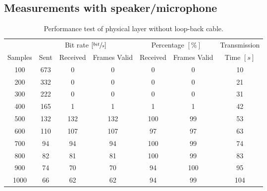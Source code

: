 	\subsection{Measurements with speaker/microphone}
	\begin{table}[!h]
		\begin{center}
			\begin{tabular}{c|c c c|c c|c}
			& \multicolumn{3}{|c|}{Bit rate $[\sfrac{bit}{s}]$} & \multicolumn{2}{c|}{Percentage $[\%]$} & Transmission \\
			Samples & Sent & Received & Frames Valid & Received & Frames Valid & Time $[s]$\\
			\hline
			100 & 673 & 0 & 0 & 0 & 0 & 10 \\
			200 & 332 & 0 & 0 & 0 & 0 & 21 \\
			300 & 222 & 0 & 0 & 0 & 0 & 31 \\
			400 & 165 & 1 & 1 & 1 & 1 & 42 \\
			500 & 132 & 132 & 132 & 100 & 99 & 53 \\
			600 & 110 & 107 & 107 & 97 & 97 & 63 \\
			700 & 94 & 94 & 94 & 100 & 99 & 74 \\
			800 & 82 & 81 & 81 & 100 & 99 & 83 \\
			900 & 74 & 70 & 70 & 94 & 100 & 95 \\
			1000 & 66 & 62 & 62 & 94 & 99 & 104 \\
			\end{tabular}
		\end{center}
		\caption{Performance test of physical layer without loop-back cable.}
		\label{tab:exp_phys_speaker}
	\end{table}